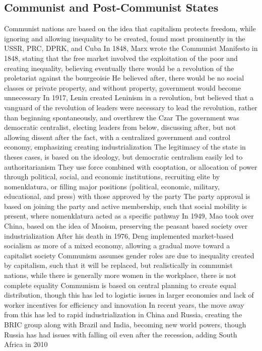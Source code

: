 \documentclass[11 pt, twoside]{article}
\newenvironment{outline*}
{
	\begin{outline}[enumerate]
	}
	{\end{outline}
}
\begin{document}
\subsection{Communist and Post-Communist States}
\begin{outline*}
\1 Communist nations are based on the idea that capitalism protects freedom, while ignoring and allowing inequality to be created, found most prominently in the USSR, PRC, DPRK, and Cuba
\1 In 1848, Marx wrote the Communist Manifesto in 1848, stating that the free market involved the exploitation of the poor and creating inequality, believing eventually there would be a revolution of the proletariat against the bourgeoisie
\2 He believed after, there would be no social classes or private property, and without property, government would become unnecessary
\1 In 1917, Lenin created Leninism in a revolution, but believed that a vanguard of the revolution of leaders were necessary to lead the revolution, rather than beginning spontaneously, and overthrew the Czar
\2 The government was democratic centralist, electing leaders from below, discussing after, but not allowing dissent after the fact, with a centralized government and control economy, emphasizing creating industrialization
\3 The legitimacy of the state in theses cases, is based on the ideology, but democratic centralism easily led to authoritarianism
\2 They use force combined with cooptation, or allocation of power through political, social, and economic institutions, recruiting elite by nomenklatura, or filling major positions (political, economic, military, educational, and press) with those approved by the party
\3 The party approval is based on joining the party and active membership, such that social mobility is present, where nomenklatura acted as a specific pathway
\1 In 1949, Mao took over China, based on the idea of Maoism, preserving the peasant based society over industrialization
\2 After his death in 1976, Deng implemented market-based socialism as more of a mixed economy, allowing a gradual move toward a capitalist society
\1 Communism assumes gender roles are due to inequality created by capitalism, such that it will be replaced, but realistically in communist nations, while there is generally more women in the workplace, there is not complete equality
\1 Communism is based on central planning to create equal distribution, though this has led to logistic issues in larger economies and lack of worker incentives for efficiency and innovation
\2 In recent years, the move away from this has led to rapid industrialization in China and Russia, creating the BRIC group along with Brazil and India, becoming new world powers, though Russia has had issues with falling oil even after the recession, adding South Africa in 2010

\end{outline*}
\end{document}
